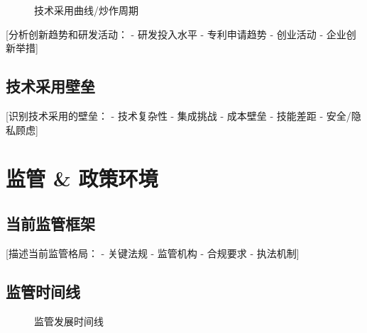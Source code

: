 \documentclass[11pt,letterpaper]{report}
\begin{document}
{%

\begin{figure}[htbp]
\centering
\caption{技术采用曲线/炒作周期}
\label{fig:innovation}
\end{figure}

[分析创新趋势和研发活动：
- 研发投入水平
- 专利申请趋势
- 创业活动
- 企业创新举措]

\section{技术采用壁垒}

[识别技术采用的壁垒：
- 技术复杂性
- 集成挑战
- 成本壁垒
- 技能差距
- 安全/隐私顾虑]

\chapter{监管 \& 政策环境}

\section{当前监管框架}

[描述当前监管格局：
- 关键法规
- 监管机构
- 合规要求
- 执法机制]

\section{监管时间线}


\begin{figure}[htbp]
\centering
\caption{监管发展时间线}
\label{fig:regulatory_timeline}
\end{figure}

}
\end{document}
